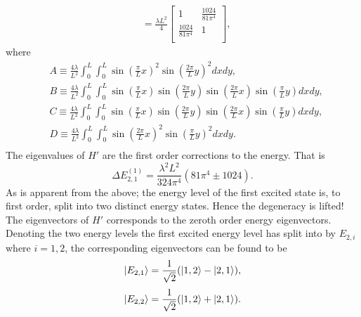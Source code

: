 \begin{example}
\begin{enumerate}
\begin{equation}
\begin{split}
				&=\frac{\lambda L^2}{4}\begin{bmatrix}
					1& \frac{1024}{81\pi^4}\\
					\frac{1024}{81\pi^4} & 1\\
				\end{bmatrix},
			\end{split}
		\end{equation} 
		where
		\begin{equation}
			\begin{split}
				&A\equiv \frac{4\lambda}{L^2}\int_{0}^{L}\int_{0}^{L} \sin(\frac{\pi}{L}x)^2\sin(\frac{2\pi}{L}y)^2dxdy,\\
				&B\equiv \frac{4\lambda}{L^2}\int_{0}^{L}\int_{0}^{L} \sin(\frac{\pi}{L}x)\sin(\frac{2\pi}{L}y)\sin(\frac{2\pi}{L}x)\sin(\frac{\pi}{L}y)dxdy,\\
				&C\equiv \frac{4\lambda}{L^2}\int_{0}^{L}\int_{0}^{L} \sin(\frac{\pi}{L}x)\sin(\frac{2\pi}{L}y)\sin(\frac{2\pi}{L}x)\sin(\frac{\pi}{L}y)dxdy, \\
				&D\equiv \frac{4\lambda}{L^2}\int_{0}^{L}\int_{0}^{L} \sin(\frac{2\pi}{L}x)^2\sin(\frac{\pi}{L}y)^2dxdy.\\		
			\end{split}
		\end{equation}
		The eigenvalues of $H'$ are the first order corrections to the energy. That is
		\begin{equation}
			\Delta E_{2,1}^{(1)}=\frac{\lambda^2L^2}{324\pi^4}(81\pi^4\pm 1024).
			\label{FPE2}
		\end{equation} 
		As is apparent from the above; the energy level of the first excited state is, to first order, split into two distinct energy states. Hence the degeneracy is lifted! \newline
		The eigenvectors of $H'$ corresponds to the zeroth order energy eigenvectors. Denoting the two energy levels the first excited energy level has split into by $E_{2,i}$ where $i=1,2$, the corresponding eigenvectors can be found to be
		\begin{equation}
			\ket{E_{2,1}}=\frac{1}{\sqrt{2}}(\ket{1,2}-\ket{2,1}),
		\end{equation} 
		\begin{equation}
			\ket{E_{2,2}}=\frac{1}{\sqrt{2}}(\ket{1,2}+\ket{2,1}).
		\end{equation} 
		
	\end{enumerate}
\end{example}

